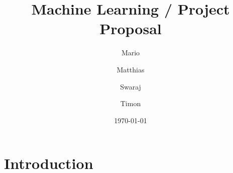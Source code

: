 \documentclass[dvips,12pt]{article}
\title{Machine Learning / Project Proposal}
\author{Mario \and Matthias \and Swaraj \and Timon}
\date{\today}
\begin{document}
\maketitle

\section{Introduction}

\begin{thebibliography}{99}

\end{thebibliography}
\end{document}
